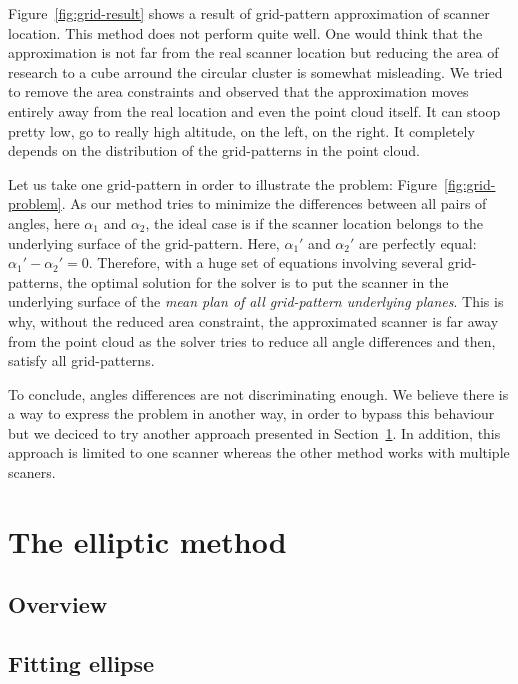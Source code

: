 Figure~\ref{fig:grid-result} shows a result of grid-pattern approximation of scanner location. This method does not perform quite well. One would think that the approximation is not far from the real scanner location but reducing the area of research to a cube arround the circular cluster is somewhat misleading. We tried to remove the area constraints and observed that the approximation moves entirely away from the real location and even the point cloud itself. It can stoop pretty low, go to really
high altitude, on the left, on the right. It completely depends on the distribution of the grid-patterns in the point cloud.

Let us take one grid-pattern in order to illustrate the problem: Figure~\ref{fig:grid-problem}. As our method tries to minimize the differences between all pairs of angles, here $\alpha_1$ and $\alpha_2$, the ideal case is if the scanner location belongs to the underlying surface of the grid-pattern. Here, $\alpha_1'$ and $\alpha_2'$ are perfectly equal: $\alpha_1' - \alpha_2' = 0$. Therefore, with a huge set of equations involving several grid-patterns, the optimal solution for
the solver is to put the scanner in the underlying surface of the \emph{mean plan of all grid-pattern underlying planes}. This is why, without the reduced area constraint, the approximated scanner is far away from the point cloud as the solver tries to reduce all angle differences and then, satisfy all grid-patterns.

To conclude, angles differences are not discriminating enough. We believe there is a way to express the problem in another way, in order to bypass this behaviour but we deciced to try another approach presented in Section~\ref{sc:elliptic}. In addition, this approach is limited to one scanner whereas the other method works with multiple scaners.



\section{The elliptic method}
\label{sc:elliptic}

\subsection{Overview}


\subsection{Fitting ellipse}


